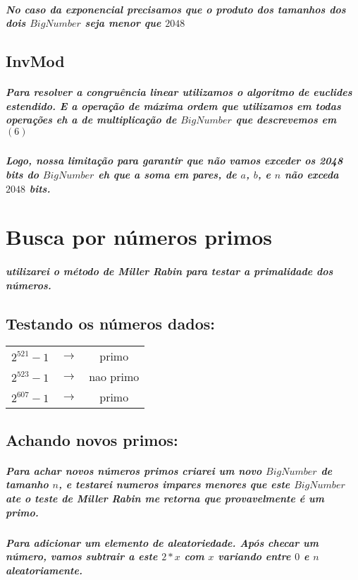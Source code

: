 \documentclass[12pt,twoside, a4paper, twocolumn]{article}
\begin{document}
\subparagraph*{No caso da exponencial precisamos que o produto dos tamanhos dos dois $BigNumber$ seja menor que $2048$ }

\subsection{InvMod}

\subparagraph*{Para resolver a congruência linear utilizamos o algoritmo de euclides estendido. E a operação de máxima ordem que utilizamos em todas operações eh a de multiplicação de $BigNumber$ que descrevemos em $(6)$}

\subparagraph*{Logo, nossa limitação para garantir que não vamos exceder os 2048 bits do $BigNumber$ eh que a soma em pares, de $a$, $b$, e $n$ não exceda $2048$ bits.}



\section{Busca por números primos}

\subparagraph*{utilizarei o método de Miller Rabin para testar a primalidade dos números.}

\subsection{Testando os números dados:}

\begin{center}
    \begin{tabular}{ |ccc| }
        \hline
        $2^{521}-1$ & $\rightarrow$ & primo     \\
        $2^{523}-1$ & $\rightarrow$ & nao primo \\
        $2^{607}-1$ & $\rightarrow$ & primo     \\
        \hline
    \end{tabular}
\end{center}

\subsection{Achando novos primos:}

\subparagraph*{Para achar novos números primos criarei um novo $BigNumber$ de tamanho $n$, e testarei numeros impares menores que este $BigNumber$ ate o teste de Miller Rabin me retorna que provavelmente é um primo.}

\subparagraph*{Para adicionar um elemento de aleatoriedade. Após checar um número, vamos subtrair a este $2*x$ com $x$ variando entre $0$ e $n$ aleatoriamente.}
\end{document}
